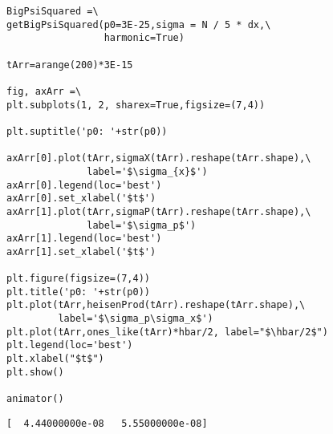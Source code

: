 \documentclass[11pt]{article}
\begin{document}
\begin{lstlisting}
BigPsiSquared =\
getBigPsiSquared(p0=3E-25,sigma = N / 5 * dx,\
                 harmonic=True)

tArr=arange(200)*3E-15

fig, axArr =\
plt.subplots(1, 2, sharex=True,figsize=(7,4))

plt.suptitle('p0: '+str(p0))

axArr[0].plot(tArr,sigmaX(tArr).reshape(tArr.shape),\
              label='$\sigma_{x}$')
axArr[0].legend(loc='best')
axArr[0].set_xlabel('$t$')
axArr[1].plot(tArr,sigmaP(tArr).reshape(tArr.shape),\
              label='$\sigma_p$')
axArr[1].legend(loc='best')
axArr[1].set_xlabel('$t$')

plt.figure(figsize=(7,4))
plt.title('p0: '+str(p0))
plt.plot(tArr,heisenProd(tArr).reshape(tArr.shape),\
         label='$\sigma_p\sigma_x$')
plt.plot(tArr,ones_like(tArr)*hbar/2, label="$\hbar/2$")
plt.legend(loc='best')
plt.xlabel("$t$")
plt.show()

animator()
\end{lstlisting}%
    
\begin{figure}
    \begin{center}
    \end{center}
\end{figure}
    
    
\begin{figure}
    \begin{center}
    \end{center}
\end{figure}
    
    \begin{Verbatim}[commandchars=\\\{\}]
[  4.44000000e-08   5.55000000e-08]

    \end{Verbatim}

    
    
\end{document}
